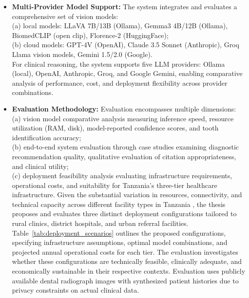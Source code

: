 \documentclass[12pt,a4paper]{report}
\begin{document}
\begin{itemize}
		\item \textbf{Multi-Provider Model Support:} The system integrates and evaluates a comprehensive set of vision models: \\
		(a) local models: LLaVA 7B/13B (Ollama), Gemma3 4B/12B (Ollama), BiomedCLIP (open clip), Florence-2 (HuggingFace); \\
		(b) cloud models: GPT-4V (OpenAI), Claude 3.5 Sonnet (Anthropic), Groq Llama vision models, Gemini 1.5/2.0 (Google). \\
		For clinical reasoning, the system supports five LLM providers: Ollama (local), OpenAI, Anthropic, Groq, and Google Gemini, enabling comparative analysis of performance, cost, and deployment flexibility across provider combinations.
		
		\item \textbf{Evaluation Methodology:} Evaluation encompasses multiple dimensions: \\
		(a) vision model comparative analysis measuring inference speed, resource utilization (RAM, disk), model-reported confidence scores, and tooth identification accuracy; \\
		(b) end-to-end system evaluation through case studies examining diagnostic recommendation quality, qualitative evaluation of citation appropriateness, and clinical utility; \\
		
		(c) deployment feasibility analysis evaluating infrastructure requirements, operational costs, and suitability for Tanzania's three-tier healthcare infrastructure. Given the substantial variation in resources, connectivity, and technical capacity across different facility types in Tanzania \cite{Edward2024OralHealthTZ}, the thesis proposes and evaluates three distinct deployment configurations tailored to rural clinics, district hospitals, and urban referral facilities. Table~\ref{tab:deployment_scenarios} outlines the proposed configurations, specifying infrastructure assumptions, optimal model combinations, and projected annual operational costs for each tier. The evaluation investigates whether these configurations are technically feasible, clinically adequate, and economically sustainable in their respective contexts. Evaluation uses publicly available dental radiograph images with synthesized patient histories due to privacy constraints on actual clinical data.
		
	\end{itemize}
	
\end{document}
